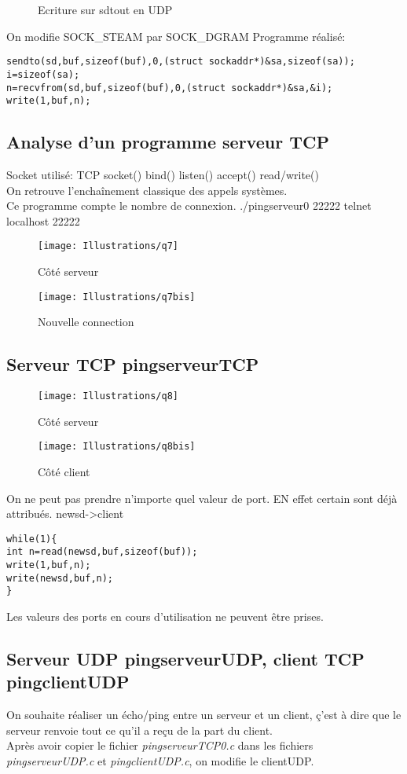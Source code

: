 \documentclass[paper=a4, fontsize=12pt]{article}
\numberwithin{equation}{section}		%
\numberwithin{figure}{section}			%
\numberwithin{table}{section}				%
\begin{document}
\begin{figure}[h!]
\caption{\label{Illustrations/decoupage_etapes_2}Ecriture sur sdtout en UDP}
\end{figure}
On modifie SOCK\_STEAM par SOCK\_DGRAM
Programme réalisé:
\begin{verbatim}
sendto(sd,buf,sizeof(buf),0,(struct sockaddr*)&sa,sizeof(sa));
i=sizeof(sa);
n=recvfrom(sd,buf,sizeof(buf),0,(struct sockaddr*)&sa,&i);
write(1,buf,n);
\end{verbatim}
\subsection{Analyse d'un programme serveur TCP}
Socket utilisé: TCP
socket()
bind()
listen()
accept()
read/write()
\\On retrouve l'enchaînement classique des appels systèmes.
\\Ce programme compte le nombre de connexion.
./pingserveur0 22222
telnet localhost 22222
\begin{figure}[h!]
\centerline{\texttt{[image: Illustrations/q7]}}
\caption{\label{Illustrations/q7} Côté serveur}
\end{figure}
\begin{figure}[h!]
\centerline{\texttt{[image: Illustrations/q7bis]}}
\caption{\label{Illustrations/q7bis} Nouvelle connection}
\end{figure}
\subsection{Serveur TCP pingserveurTCP}
\begin{figure}[h!]
\centerline{\texttt{[image: Illustrations/q8]}}
\caption{\label{Illustrations/q8} Côté serveur}
\end{figure}
\begin{figure}[h!]
\centerline{\texttt{[image: Illustrations/q8bis]}}
\caption{\label{Illustrations/q8bis} Côté client}
\end{figure}
On ne peut pas prendre n'importe quel valeur de port. EN effet certain sont déjà attribués.
newsd->client
\begin{verbatim}
while(1){
int n=read(newsd,buf,sizeof(buf));
write(1,buf,n);
write(newsd,buf,n);
}
\end{verbatim}
Les valeurs des ports en cours d'utilisation ne peuvent être prises.
\subsection{Serveur UDP pingserveurUDP, client TCP pingclientUDP}
On souhaite réaliser un écho/ping entre un serveur et un client, ç'est à dire que le serveur renvoie tout ce qu'il a reçu de la part du client. 
\\Après avoir copier le fichier \textit{pingserveurTCP0.c} dans les fichiers  \textit{pingserveurUDP.c} et  \textit{pingclientUDP.c}, on modifie le clientUDP.
\end{document}
